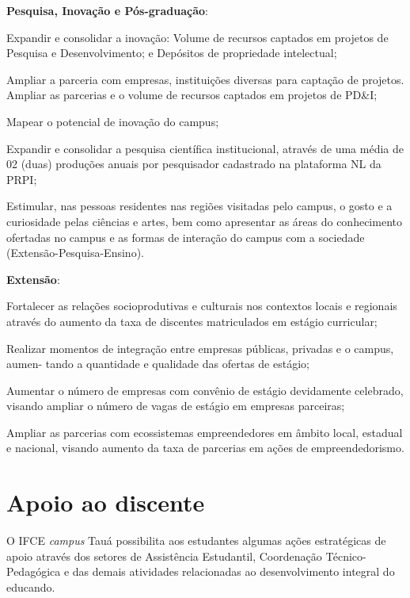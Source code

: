 \documentclass[
	12pt,				%
	openright,			%
	twoside,			%
	a4paper,			%
	chapter=TITLE,		%
	english,			%
	french,				%
	spanish,			%
	brazil,				%
	]{abntex2}
\begin{document}
	\textbf{Pesquisa, Inovação e Pós-graduação}:
	\begin{alineas}
	  \item Expandir e consolidar a inovação: Volume de recursos captados em projetos de Pesquisa e Desenvolvimento; e Depósitos de propriedade intelectual;
	  \item Ampliar a parceria com empresas, instituições diversas para captação de projetos. Ampliar as parcerias e o volume de recursos captados em projetos de PD\&I;
	  \item Mapear o potencial de inovação do campus;
	  \item Expandir e consolidar a pesquisa científica institucional, através de uma média de 02 (duas) produções anuais por pesquisador cadastrado na plataforma NL da PRPI;
	  \item Estimular, nas pessoas residentes nas regiões visitadas pelo campus, o gosto e a curiosidade pelas ciências e artes, bem como apresentar as áreas do conhecimento ofertadas no campus e as formas de interação do campus com a sociedade (Extensão-Pesquisa-Ensino).
	\end{alineas}
	
	\textbf{Extensão}:
	\begin{alineas}
	  \item Fortalecer as relações socioprodutivas e culturais nos contextos locais e regionais através do aumento da taxa de discentes matriculados em estágio curricular;
	  \item Realizar momentos de integração entre empresas públicas, privadas e o campus, aumen- tando a quantidade e qualidade das ofertas de estágio;
	  \item Aumentar o número de empresas com convênio de estágio devidamente celebrado, visando ampliar o número de vagas de estágio em empresas parceiras;
		\item Ampliar as parcerias com ecossistemas empreendedores em âmbito local, estadual e nacional, visando aumento da taxa de parcerias em ações de empreendedorismo.
	  

	\end{alineas}


\chapter{Apoio ao discente}
O IFCE \textit{campus} Tauá possibilita aos estudantes algumas ações estratégicas de apoio através dos setores de Assistência Estudantil, Coordenação Técnico-Pedagógica e das demais atividades relacionadas ao desenvolvimento integral do educando.
\end{document}
